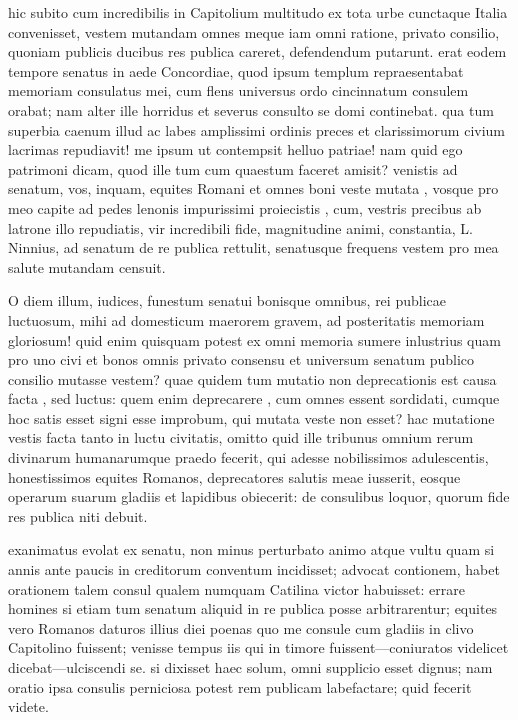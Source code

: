  hic subito cum incredibilis in Capitolium multitudo ex tota urbe cunctaque Italia convenisset, vestem mutandam omnes meque iam omni ratione, privato consilio, quoniam publicis ducibus res publica careret, defendendum putarunt. erat eodem tempore senatus in aede Concordiae, quod ipsum templum repraesentabat memoriam consulatus mei, cum flens universus ordo cincinnatum consulem orabat; nam alter ille horridus et severus consulto se domi continebat. qua tum superbia caenum illud ac labes amplissimi ordinis preces et clarissimorum civium lacrimas repudiavit! me ipsum ut contempsit helluo patriae! nam quid ego patrimoni dicam, quod ille tum cum quaestum faceret amisit? venistis ad senatum, vos, inquam, equites Romani et omnes boni veste mutata , vosque pro meo capite ad pedes lenonis impurissimi proiecistis , cum, vestris precibus ab latrone illo repudiatis, vir incredibili fide, magnitudine animi, constantia, L. Ninnius, ad senatum de re publica rettulit, senatusque frequens vestem pro mea salute mutandam censuit.

 O diem illum, iudices, funestum senatui bonisque omnibus, rei publicae luctuosum, mihi ad domesticum maerorem gravem, ad posteritatis memoriam gloriosum! quid enim quisquam potest ex omni memoria sumere inlustrius quam pro uno civi et bonos omnis privato consensu et universum senatum publico consilio mutasse vestem? quae quidem tum mutatio non deprecationis est causa facta , sed luctus: quem enim deprecarere , cum omnes essent sordidati, cumque hoc satis esset signi esse improbum, qui mutata veste non esset? hac mutatione vestis facta tanto in luctu civitatis, omitto quid ille tribunus omnium rerum divinarum humanarumque praedo fecerit, qui adesse nobilissimos adulescentis, honestissimos equites Romanos, deprecatores salutis meae iusserit, eosque operarum suarum gladiis et lapidibus obiecerit: de consulibus loquor, quorum fide res publica niti debuit.

 exanimatus evolat ex senatu, non minus perturbato animo atque vultu quam si annis ante paucis in creditorum conventum incidisset; advocat contionem, habet orationem talem consul qualem numquam Catilina victor habuisset: errare homines si etiam tum senatum aliquid in re publica posse arbitrarentur; equites vero Romanos daturos illius diei poenas quo me consule cum gladiis in clivo Capitolino fuissent; venisse tempus iis qui in timore fuissent—coniuratos videlicet dicebat—ulciscendi se. si dixisset haec solum, omni supplicio esset dignus; nam oratio ipsa consulis perniciosa potest rem publicam labefactare; quid fecerit videte.

